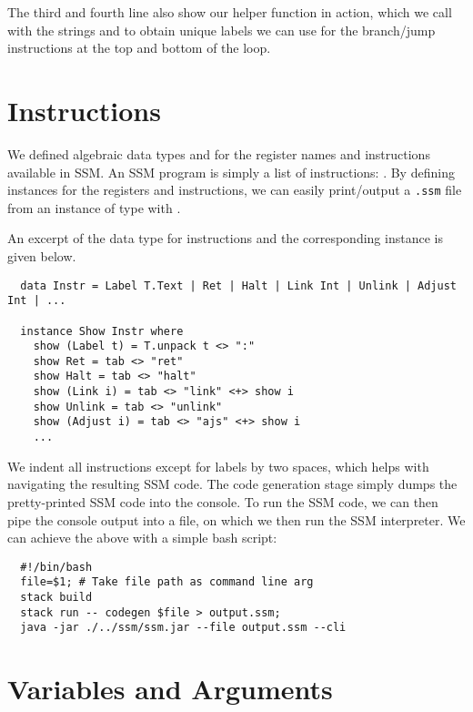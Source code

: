 The third and fourth line also show our  helper function in
action, which we call with the strings  and 
to obtain unique labels we can use for the branch/jump instructions at the
top and bottom of the  loop.



\section{Instructions} \label{sec:codegen-instructions}

We defined algebraic data types  and  for the
register names and instructions available in SSM. An SSM program is simply a
list of instructions: .
By defining  instances for the registers and instructions, we can
easily print/output a \verb|.ssm| file from an instance of type
\haskell{[Instr]} with .

An excerpt of the data type for instructions and the corresponding 
instance is given below.

\begin{verbatim}
  data Instr = Label T.Text | Ret | Halt | Link Int | Unlink | Adjust Int | ...

  instance Show Instr where
    show (Label t) = T.unpack t <> ":"
    show Ret = tab <> "ret"
    show Halt = tab <> "halt"
    show (Link i) = tab <> "link" <+> show i
    show Unlink = tab <> "unlink"
    show (Adjust i) = tab <> "ajs" <+> show i
    ...
\end{verbatim}

We indent all instructions except for labels by two spaces, which helps with
navigating the resulting SSM code.
The code generation stage simply dumps the pretty-printed SSM code into the
console. To run the SSM code, we can then pipe the console output into a
file, on which we then run the SSM interpreter.
We can achieve the above with a simple bash script:
%
\begin{verbatim}
  #!/bin/bash
  file=$1; # Take file path as command line arg
  stack build
  stack run -- codegen $file > output.ssm;
  java -jar ./../ssm/ssm.jar --file output.ssm --cli
\end{verbatim}


\section{Variables and Arguments} \label{sec:codegen-vars-args}

